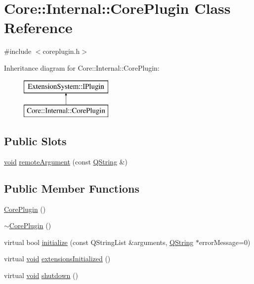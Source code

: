 \hypertarget{class_core_1_1_internal_1_1_core_plugin}{\section{\-Core\-:\-:\-Internal\-:\-:\-Core\-Plugin \-Class \-Reference}
\label{class_core_1_1_internal_1_1_core_plugin}
}


{\ttfamily \#include $<$coreplugin.\-h$>$}

\-Inheritance diagram for \-Core\-:\-:\-Internal\-:\-:\-Core\-Plugin\-:\begin{figure}[H]
\begin{center}
\leavevmode
\includegraphics[height=2.000000cm]{class_core_1_1_internal_1_1_core_plugin}
\end{center}
\end{figure}
\subsection*{\-Public \-Slots}
\begin{DoxyCompactItemize}
\item 
\hyperlink{group___u_a_v_objects_plugin_ga444cf2ff3f0ecbe028adce838d373f5c}{void} \hyperlink{group___core_plugin_gac1ee746ae92fbd6552ea417e4f377a0f}{remote\-Argument} (const \hyperlink{group___u_a_v_objects_plugin_gab9d252f49c333c94a72f97ce3105a32d}{\-Q\-String} \&)
\end{DoxyCompactItemize}
\subsection*{\-Public \-Member \-Functions}
\begin{DoxyCompactItemize}
\item 
\hyperlink{group___core_plugin_gaf6d8419d70a20ad1f422d1ba6910c99b}{\-Core\-Plugin} ()
\item 
\hyperlink{group___core_plugin_gafd4119882379715a42de4bad67235335}{$\sim$\-Core\-Plugin} ()
\item 
virtual bool \hyperlink{group___core_plugin_ga2ff3446eb96ef85ad12d4ad20da5ad15}{initialize} (const \-Q\-String\-List \&arguments, \hyperlink{group___u_a_v_objects_plugin_gab9d252f49c333c94a72f97ce3105a32d}{\-Q\-String} $\ast$error\-Message=0)
\item 
virtual \hyperlink{group___u_a_v_objects_plugin_ga444cf2ff3f0ecbe028adce838d373f5c}{void} \hyperlink{group___core_plugin_ga55b0e03148abe8106f161d21fe097dcb}{extensions\-Initialized} ()
\item 
virtual \hyperlink{group___u_a_v_objects_plugin_ga444cf2ff3f0ecbe028adce838d373f5c}{void} \hyperlink{group___core_plugin_ga792f6f751294fccbc48bb39e266e48b8}{shutdown} ()
\end{DoxyCompactItemize}


